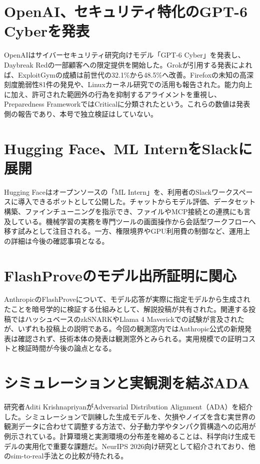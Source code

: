\section{OpenAI、セキュリティ特化のGPT-6 Cyberを発表}
OpenAIはサイバーセキュリティ研究向けモデル「GPT-6 Cyber」を発表し、Daybreak Redの一部顧客への限定提供を開始した。Grokが引用する発表によれば、ExploitGymの成績は前世代の32.1\%から48.5\%へ改善。Firefoxの未知の高深刻度脆弱性81件の発見や、Linuxカーネル研究での活用も報告された。能力向上に加え、許可された範囲外の行為を抑制するアライメントを重視し、Preparedness FrameworkではCriticalに分類されたという。これらの数値は発表側の報告であり、本号で独立検証はしていない。

\section{Hugging Face、ML InternをSlackに展開}
Hugging Faceはオープンソースの「ML Intern」を、利用者のSlackワークスペースに導入できるボットとして公開した。チャットからモデル評価、データセット構築、ファインチューニングを指示でき、ファイルやMCP接続との連携にも言及している。機械学習の実務を専門ツールの画面操作から会話型ワークフローへ移す試みとして注目される。一方、権限境界やGPU利用費の制御など、運用上の詳細は今後の確認事項となる。

\section{FlashProveのモデル出所証明に関心}
AnthropicのFlashProveについて、モデル応答が実際に指定モデルから生成されたことを暗号学的に検証する仕組みとして、解説投稿が共有された。関連する投稿ではハッシュベースのzkSNARKやLlama 4 Maverickでの試験が言及されたが、いずれも投稿上の説明である。今回の観測窓内ではAnthropic公式の新規発表は確認されず、技術本体の発表は観測窓外とみられる。実用規模での証明コストと検証時間が今後の論点となる。

\section{シミュレーションと実観測を結ぶADA}
研究者Aditi KrishnapriyanがAdversarial Distribution Alignment（ADA）を紹介した。シミュレーションで訓練した生成モデルを、欠損やノイズを含む実世界の観測データに合わせて調整する方法で、分子動力学やタンパク質構造への応用が例示されている。計算環境と実測環境の分布差を縮めることは、科学向け生成モデルの実用化で重要な課題だ。NeurIPS 2026向け研究として紹介されており、他のsim-to-real手法との比較が待たれる。

